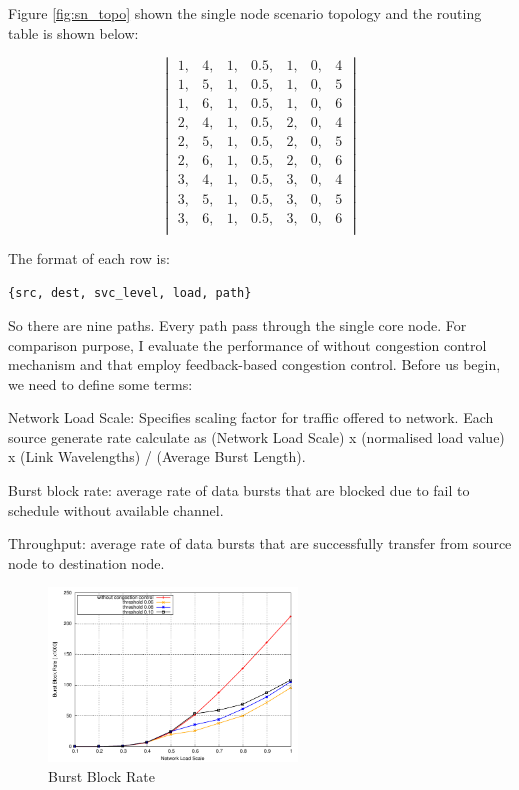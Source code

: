 
Figure \ref{fig:sn_topo} shown the single node scenario topology and the routing table is shown below:

$$\begin{vmatrix}  
 1, & 4, & 1, & 0.5, & 1, & 0, & 4 \\  
 1, & 5, & 1, & 0.5, & 1, & 0, & 5 \\  
 1, & 6, & 1, & 0.5, & 1, & 0, & 6 \\  
 2, & 4, & 1, & 0.5, & 2, & 0, & 4 \\  
 2, & 5, & 1, & 0.5, & 2, & 0, & 5 \\  
 2, & 6, & 1, & 0.5, & 2, & 0, & 6 \\  
 3, & 4, & 1, & 0.5, & 3, & 0, & 4 \\  
 3, & 5, & 1, & 0.5, & 3, & 0, & 5 \\  
 3, & 6, & 1, & 0.5, & 3, & 0, & 6 \\  
\end{vmatrix}$$

The format of each row is:
\par
{\tt \{src, dest, svc\_level, load, path\}}

So there are nine paths. Every path pass through the single core node. For comparison purpose, I evaluate the performance of without congestion control mechanism and that employ feedback-based congestion control. Before us begin, we need to define some terms:

Network Load Scale: Specifies scaling factor for traffic offered to network. Each source generate rate calculate as (Network Load Scale) x (normalised load value) x (Link Wavelengths) / (Average Burst Length).

Burst block rate: average rate of data bursts that are blocked due to fail to schedule without available channel. 

Throughput: average rate of data bursts that are successfully transfer from source node to destination node.

\begin{figure}[!htb]
\centering
\includegraphics[width=2.6in]{result/single_node/block_rate_avg}
\caption{Burst Block Rate}
\label{fig:sn_block_rate}
\end{figure}

